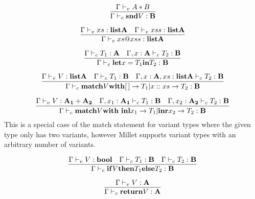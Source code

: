 \documentclass{article}
\begin{document}
\[\infer{\Gamma \vdash_c \mathbf{snd} V:\mathbf{B}}{\Gamma \vdash_v A*B}\]

\[\infer{\Gamma \vdash_c xs @ xss:\mathbf{list A}}{\Gamma \vdash_v xs: \mathbf{list A} \quad \Gamma \vdash_v xss: \mathbf{list A}}\]

\[\infer{\Gamma \vdash_c \mathbf{let} x = T_1 \mathbf{in} T_2:\mathbf{B}}{\Gamma \vdash_c T_1: \mathbf{A} \quad \Gamma, x:\mathbf{A} \vdash_c T_2: \mathbf{B}}\]

\[\infer{\Gamma \vdash_c \mathbf{match} V \mathbf{with} [\,] \to T_1 | x::xs \to T_2 :\mathbf{B}}{\Gamma \vdash_v V: \mathbf{list A} \quad \Gamma \vdash_c T_1: \mathbf{B} \quad \Gamma,x:\mathbf{A}, xs:\mathbf{list A} \vdash_c T_2: \mathbf{B}}\]

\[\infer{\Gamma \vdash_c \mathbf{match} V \mathbf{with}\,\,\mathbf{inl} x_1 \to T_1 | \mathbf{inr} x_2 \to T_2 :\mathbf{B}}{\Gamma \vdash_v V: \mathbf{A_1 + A_2} \quad \Gamma, x_1:\mathbf{A_1} \vdash_c T_1: \mathbf{B} \quad \Gamma, x_2:\mathbf{A_2} \vdash_c T_2: \mathbf{B}}\]
This is a special case of the match statement for variant types where the given type only has two variants, however Millet supports variant types with an arbitrary number of variants.

\[\infer{\Gamma \vdash_c \mathbf{if} V \mathbf{then} T_1 \mathbf{else} T_2:\mathbf{B}}{\Gamma \vdash_v V: \mathbf{bool} \quad \Gamma \vdash_c T_1: \mathbf{B}\quad \Gamma \vdash_c T_2: \mathbf{B}}\]

\[\infer{\Gamma \vdash_c \mathbf{return}V:\mathbf{A}}{\Gamma \vdash_v V: \mathbf{A}}\]
\end{document}
